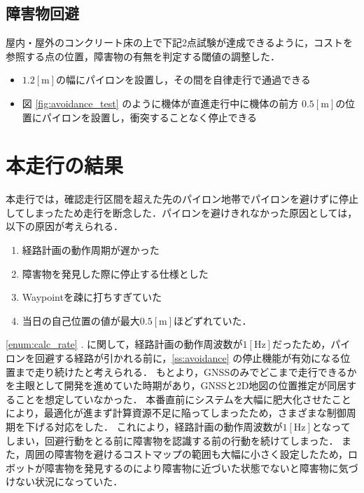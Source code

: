 \documentclass[platex,dvipdfmx]{rbproceedings}
\begin{document}
\subsection{障害物回避}

屋内・屋外のコンクリート床の上で下記2点試験が達成できるように，コストを参照する点の位置，障害物の有無を判定する閾値の調整した．
\begin{itemize}
    \item $1.2[\mathrm{m}]$の幅にパイロンを設置し，その間を自律走行で通過できる
    \item 図 \ref{fig:avoidance_test} のように機体が直進走行中に機体の前方  $0.5[\mathrm{m}]$の位置にパイロンを設置し，衝突することなく停止できる
\end{itemize}

\section{本走行の結果}
本走行では，確認走行区間を超えた先のパイロン地帯でパイロンを避けずに停止してしまったため走行を断念した．パイロンを避けきれなかった原因としては，以下の原因が考えられる．

\begin{enumerate}
    \item 経路計画の動作周期が遅かった \label{enum:calc_rate}
    \item 障害物を発見した際に停止する仕様とした \label{enum:stop}
    \item Waypointを疎に打ちすぎていた \label{eunm:waypoint}
    \item 当日の自己位置の値が最大$0.5[ \mathrm{m}]$ほどずれていた．\label{eunm:gnss}
\end{enumerate}

\ref{enum:calc_rate} . に関して，経路計画の動作周波数が$1[ \mathrm{Hz}]$だったため，パイロンを回避する経路が引かれる前に，\ref{ss:avoidance} の停止機能が有効になる位置まで走り続けたと考えられる．
もとより，GNSSのみでどこまで走行できるかを主眼として開発を進めていた時期があり，GNSSと2D地図の位置推定が同居することを想定していなかった．
本番直前にシステムを大幅に肥大化させたことにより，最適化が進まず計算資源不足に陥ってしまったため，さまざまな制御周期を下げる対応をした．
これにより，経路計画の動作周波数が$1[ \mathrm{Hz}]$となってしまい，回避行動をとる前に障害物を認識する前の行動を続けてしまった．
また，周囲の障害物を避けるコストマップの範囲も大幅に小さく設定したため，ロボットが障害物を発見するのにより障害物に近づいた状態でないと障害物に気づけない状況になっていた．
\end{document}
